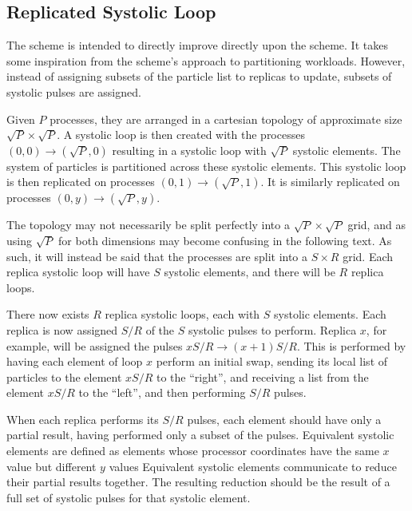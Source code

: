 \subsection{Replicated Systolic Loop}

The \replicatedsystolicloop{} scheme is intended to directly improve directly
upon the \systolicloop{} scheme.
%
It takes some inspiration from the \replicateddata{} scheme's approach
to partitioning workloads.
%
However, instead of assigning subsets of the particle list to replicas
to update, subsets of systolic pulses are assigned.

Given $P$ processes, they are arranged in a cartesian topology of
approximate size $\sqrt{P} \times{} \sqrt{P}$.
%
A systolic loop is then created with the processes
$(0,0) \rightarrow{} (\sqrt{P}, 0)$
resulting in a systolic loop with $\sqrt{P}$ systolic elements.
%
The system of particles is partitioned across these systolic elements.
%
This systolic loop is then replicated on processes
$(0,1) \rightarrow{} (\sqrt{P}, 1)$.
%
It is similarly replicated on processes $(0,y) \rightarrow{} (\sqrt{P},y)$.

The topology may not necessarily be split perfectly into a
$\sqrt{P} \times{} \sqrt{P}$ grid, and as using $\sqrt{P}$ for both
dimensions may become confusing in the following text.
%
As such, it will instead be said that the processes are split into a
$S \times{} R$ grid.
%
Each replica systolic loop will have $S$ systolic elements,
and there will be $R$ replica loops.

There now exists $R$ replica systolic loops, each with $S$
systolic elements.
%
Each replica is now assigned $S/R$ of the $S$ systolic pulses to
perform.
%
Replica $x$, for example, will be assigned the pulses
$xS/R \rightarrow{} (x+1)S/R$.
%
This is performed by having each element of loop $x$ perform an initial
swap, sending its local list of particles to
the element $xS/R$ to the ``right'',
and receiving a list from the element $xS/R$ to the ``left'',
and then performing $S/R$ pulses.

When each replica performs its $S/R$ pulses, each element
should have only a partial result, having performed only a subset
of the pulses.
%
Equivalent systolic elements are defined as elements whose
processor coordinates have the same $x$ value but different $y$ values
%
Equivalent systolic elements communicate to
reduce their partial results together.
%
The resulting reduction should be the result of a full set of systolic pulses
for that systolic element.

